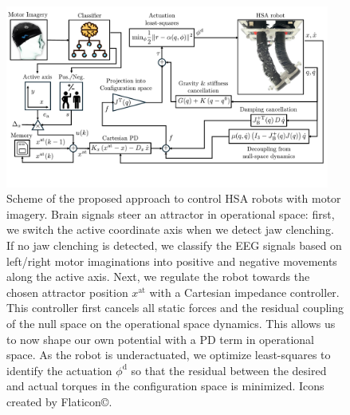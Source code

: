 \begin{figure}
    \centering
    \includegraphics[width=0.95\textwidth]{braincontrol/figures/control_scheme/control_scheme_v2_cropped.pdf}
    \caption{Scheme of the proposed approach to control HSA robots with motor imagery. Brain signals steer an attractor in operational space: first, we switch the active coordinate axis when we detect jaw clenching. If no jaw clenching is detected, we classify the EEG signals based on left/right motor imaginations into positive and negative movements along the active axis. Next, we regulate the robot towards the chosen attractor position $x^\mathrm{at}$ with a Cartesian impedance controller. This controller first cancels all static forces and the residual coupling of the null space on the operational space dynamics. This allows us to now shape our own potential with a PD term in operational space. As the robot is underactuated, we optimize least-squares to identify the actuation $\phi^\mathrm{d}$ so that the residual between the desired and actual torques in the configuration space is minimized. Icons created by Flaticon\copyright.}
    \label{fig:braincontrol:control_scheme}
\end{figure}

